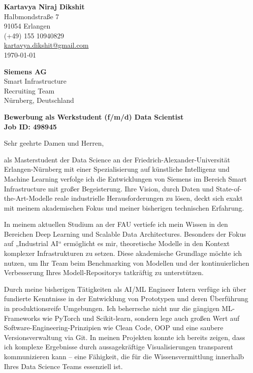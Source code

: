 \documentclass[10pt, a4paper]{article}
\begin{document}
\begin{flushright}
    \textbf{Kartavya Niraj Dikshit} \\
    Halbmondstraße 7 \\
    91054 Erlangen \\
    (+49) 155 10940829 \\
    \href{mailto:kartavya.dikshit@gmail.com}{kartavya.dikshit@gmail.com} \\
    \today
\end{flushright}

\vspace{1em}

\textbf{Siemens AG} \\
Smart Infrastructure \\
Recruiting Team \\
Nürnberg, Deutschland

\vspace{2em}

{\large \textbf{\color{primarycolor} Bewerbung als Werkstudent (f/m/d) Data Scientist}} \\
\textbf{Job ID: 498945}

\vspace{1.5em}

Sehr geehrte Damen und Herren,

als Masterstudent der Data Science an der Friedrich-Alexander-Universität Erlangen-Nürnberg mit einer Spezialisierung auf künstliche Intelligenz und Machine Learning verfolge ich die Entwicklungen von Siemens im Bereich Smart Infrastructure mit großer Begeisterung. Ihre Vision, durch Daten und State-of-the-Art-Modelle reale industrielle Herausforderungen zu lösen, deckt sich exakt mit meinem akademischen Fokus und meiner bisherigen technischen Erfahrung.

In meinem aktuellen Studium an der FAU vertiefe ich mein Wissen in den Bereichen Deep Learning und Scalable Data Architectures. Besonders der Fokus auf „Industrial AI“ ermöglicht es mir, theoretische Modelle in den Kontext komplexer Infrastrukturen zu setzen. Diese akademische Grundlage möchte ich nutzen, um Ihr Team beim Benchmarking von Modellen und der kontinuierlichen Verbesserung Ihres Modell-Repositorys tatkräftig zu unterstützen.

Durch meine bisherigen Tätigkeiten als AI/ML Engineer Intern verfüge ich über fundierte Kenntnisse in der Entwicklung von Prototypen und deren Überführung in produktionsreife Umgebungen. Ich beherrsche nicht nur die gängigen ML-Frameworks wie PyTorch und Scikit-learn, sondern lege auch großen Wert auf Software-Engineering-Prinzipien wie Clean Code, OOP und eine saubere Versionsverwaltung via Git. In meinen Projekten konnte ich bereits zeigen, dass ich komplexe Ergebnisse durch aussagekräftige Visualisierungen transparent kommunizieren kann – eine Fähigkeit, die für die Wissensvermittlung innerhalb Ihres Data Science Teams essenziell ist.
\end{document}
